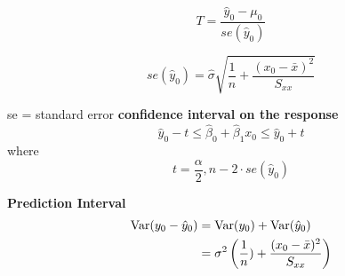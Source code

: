 \begin{equation}
  T = \frac{\hat{y}_0 - \mu_0}{se(\hat{y}_0)}
\end{equation}

\begin{equation}
  se(\hat{y}_0)=\hat{\sigma}\sqrt{\frac{1}{n} + \frac{(x_0 - \bar{x})^2}{S_{xx}}}
\end{equation}

se = standard error
\textbf{confidence interval on the response}
\begin{equation}
  \hat{y}_0 - t \leq \hat{\beta}_0 +  \hat{\beta}_1 x_0 \leq \hat{y}_0 + t
\end{equation}
where
\begin{equation}
  t = \frac{\alpha}{2},n-2 \cdot se(\hat{y}_0)
\end{equation}

\textbf{Prediction Interval}\\

\begin{equation}
  \begin{align}
      \textup{Var}(y_0 - \hat{y}_0) &= \textup{Var}(y_0) + \textup{Var}(\hat{y}_0)\\
      &= \sigma^2\left(\frac{1}{n}) + \frac{(x_0 - \bar{x})^2}{S_{xx}}\right)
  \end{align}
\end{equation}
